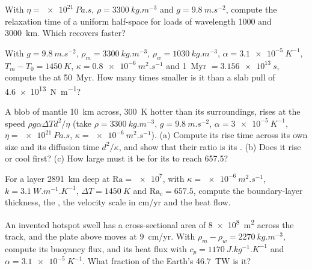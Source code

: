 \begin{exercise}[$\star$]\label{exo:b3:mantle-convection:3}
With $\eta = \qty{e21}{Pa.s}$, $\rho = \qty{3300}{kg.m^{-3}}$ and $g =
\qty{9.8}{m.s^{-2}}$, compute the relaxation time of a uniform half-space for
loads of wavelength 1000 and \qty{3000}{km}. Which recovers faster?
\end{exercise}

\begin{exercise}[$\star$]\label{exo:b3:mantle-convection:4}
With $g = \qty{9.8}{m.s^{-2}}$, $\rho_m = \qty{3300}{kg.m^{-3}}$, $\rho_w =
\qty{1030}{kg.m^{-3}}$, $\alpha = \qty{3.1e-5}{K^{-1}}$, $T_m - T_0 =
\qty{1450}{K}$, $\kappa = \qty{0.8e-6}{m^2.s^{-1}}$ and \qty{1}{Myr} $=
\qty{3.156e13}{s}$, compute the  at \qty{50}{Myr}. How many times
smaller is it than a slab pull of \qty{4.6e13}{N.m^{-1}}?
\end{exercise}

\begin{exercise}[$\star\star$]\label{exo:b3:mantle-convection:5}
A blob of mantle \qty{10}{km} across, \qty{300}{K} hotter than its
surroundings, rises at the speed $\rho g\alpha\Delta Td^2/\eta$ (take $\rho =
\qty{3300}{kg.m^{-3}}$, $g = \qty{9.8}{m.s^{-2}}$, $\alpha = \qty{3e-5}{K^{-1}}$,
$\eta = \qty{e21}{Pa.s}$, $\kappa = \qty{e-6}{m^2.s^{-1}}$). (a) Compute its
rise time across its own size and its diffusion time $d^2/\kappa$, and show
that their ratio is its . (b) Does it rise or cool first? (c)
How large must it be for its  to reach 657.5?
\end{exercise}

\begin{exercise}[$\star\star$]\label{exo:b3:mantle-convection:6}
For a layer \qty{2891}{km} deep at $\mathrm{Ra} = \num{e7}$, with $\kappa =
\qty{e-6}{m^2.s^{-1}}$, $k = \qty{3.1}{W.m^{-1}.K^{-1}}$, $\Delta T =
\qty{1450}{K}$ and $\mathrm{Ra}_c = 657.5$, compute the boundary-layer
thickness, the , the velocity scale in \unit{cm/yr} and the heat
flow.
\end{exercise}

\begin{exercise}[$\star\star$]\label{exo:b3:mantle-convection:7}
An invented hotspot swell has a cross-sectional area of \qty{8e8}{m^2} across
the track, and the plate above moves at \qty{9}{cm/yr}. With $\rho_m - \rho_w =
\qty{2270}{kg.m^{-3}}$, compute its buoyancy flux, and its heat flux with $c_p =
\qty{1170}{J.kg^{-1}.K^{-1}}$ and $\alpha = \qty{3.1e-5}{K^{-1}}$. What fraction
of the Earth's \qty{46.7}{TW} is it?
\end{exercise}

